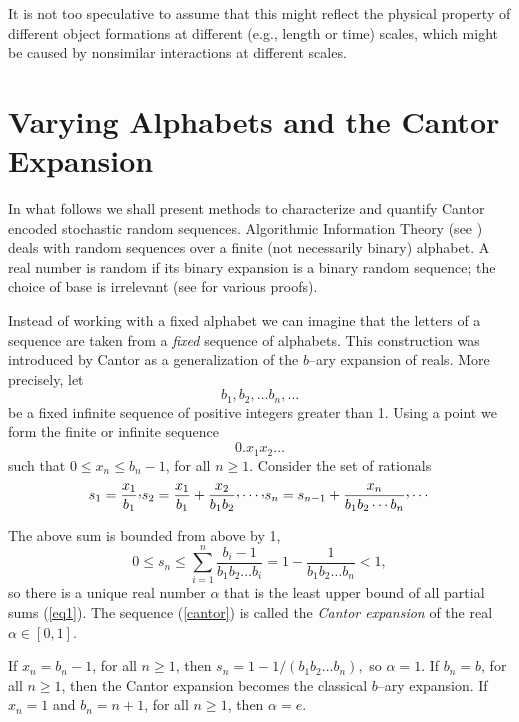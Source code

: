 \documentclass{elsart}
\begin{document}
It is not too speculative to assume that this might reflect the physical
property
of different object formations at different (e.g., length or time) scales,
which might
be caused by nonsimilar interactions at different scales.


\section{Varying Alphabets and the Cantor Expansion}


In  what follows we shall present
methods to characterize and quantify Cantor encoded stochastic random sequences.
Algorithmic Information Theory (see \cite{chaitin3,chaitin:01,calude:02})
deals with random sequences over a finite (not necessarily binary)
alphabet. A real number is random if its binary expansion is
a binary random sequence; the choice of base is irrelevant
(see \cite{calude:02} for various proofs).


Instead of working with a fixed alphabet we can imagine that the letters of
a sequence are taken from a {\it fixed}
sequence of alphabets.  This construction was introduced by Cantor
as a generalization of the $b$--ary
expansion of reals.  More precisely, let
\[b_1, b_2, \ldots b_n, \ldots\]
be a fixed infinite sequence of positive integers greater than 1. Using a
point we form the finite or infinite sequence
\begin{equation}
\label{cantor}
0.x_{1}x_{2} \ldots
\end{equation}
such that  $0 \le x_n \le b_n-1$, for all $n\ge 1$. Consider the set of
rationals
\begin{equation}
\label{eq1}
s_1 = \frac{x_1}{b_1}  \raisebox{.5ex}{,}  s_2 = \frac{x_1}{b_1} +
\frac{x_2}{b_1b_2}
\raisebox{.5ex}{,}  \cdots \raisebox{.5ex}{,}  s_n =
s_{n-1} + \frac{x_n}{b_1 b_2 \cdots b_n}\raisebox{.5ex}{,} \cdots
\end{equation}

The above sum is bounded from above by 1,
\[0 \le s_n \le \sum_{i=1}^n \frac{b_i - 1}{b_1 b_2 \ldots b_i} = 1 -
\frac{1}{b_1 b_2 \ldots b_n} < 1,\]
so there is a unique real number $\alpha$ that is the least upper bound of
all partial sums (\ref{eq1}). The sequence (\ref{cantor}) is called the {\it
Cantor  expansion}
of the real $\alpha \in [0,1]$.


If $x_n = b_n -1$, for all $n \ge 1$, then $s_n = 1 -
1/(b_1 b_2 \ldots b_n),$ so $\alpha =1$.
If $b_n = b$, for all $n\ge 1$, then the Cantor expansion becomes the
classical $b$--ary expansion. If $x_n =1$ and $b_n = n+1$, for all $n \ge
1$, then $\alpha = e$.
\end{document}
